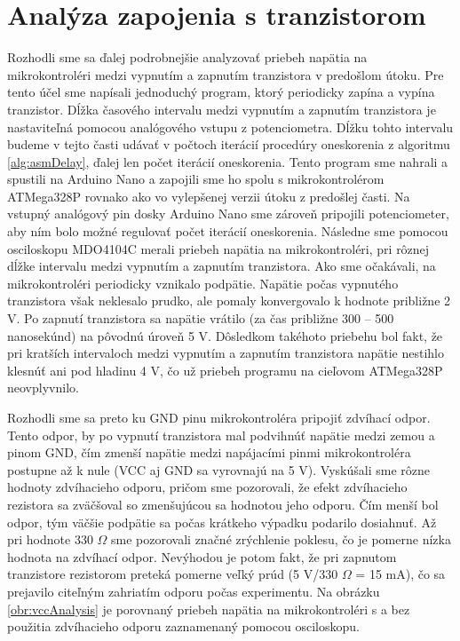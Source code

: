 \section{Analýza zapojenia s tranzistorom}
Rozhodli sme sa ďalej podrobnejšie analyzovať priebeh napätia na mikrokontroléri medzi vypnutím a zapnutím tranzistora v predošlom útoku. Pre tento účel sme napísali jednoduchý program, ktorý periodicky zapína a vypína tranzistor. Dĺžka časového intervalu medzi vypnutím a zapnutím tranzistora je nastaviteľná pomocou analógového vstupu z potenciometra. Dĺžku tohto intervalu budeme v tejto časti udávať v počtoch iterácií procedúry oneskorenia z algoritmu \ref{alg:asmDelay}, ďalej len počet iterácií oneskorenia. Tento program sme nahrali a spustili na Arduino Nano a zapojili sme ho spolu s mikrokontrolérom ATMega328P rovnako ako vo vylepšenej verzii útoku z predošlej časti. Na vstupný analógový pin dosky Arduino Nano sme zároveň pripojili potenciometer, aby ním bolo možné regulovať počet iterácií oneskorenia. Následne sme pomocou osciloskopu MDO4104C merali priebeh napätia na mikrokontroléri, pri rôznej dĺžke intervalu medzi vypnutím a zapnutím tranzistora. Ako sme očakávali, na mikrokontroléri periodicky vznikalo podpätie. Napätie počas vypnutého tranzistora však neklesalo prudko, ale pomaly konvergovalo k hodnote približne 2 V. Po zapnutí tranzistora sa napätie vrátilo (za čas približne 300 -- 500 nanosekúnd) na pôvodnú úroveň 5 V. Dôsledkom takéhoto priebehu bol fakt, že pri kratších intervaloch medzi vypnutím a zapnutím tranzistora napätie nestihlo klesnúť ani pod hladinu 4 V, čo už priebeh programu na cieľovom ATMega328P neovplyvnilo.

Rozhodli sme sa preto ku GND pinu mikrokontroléra pripojiť zdvíhací odpor. Tento odpor, by po vypnutí tranzistora mal podvihnúť napätie medzi zemou a pinom GND, čím zmenší napätie medzi napájacími pinmi mikrokontroléra postupne až k nule (VCC aj GND sa vyrovnajú na 5 V). Vyskúšali sme rôzne hodnoty zdvíhacieho odporu, pričom sme pozorovali, že efekt zdvíhacieho rezistora sa zväčšoval so zmenšujúcou sa hodnotou jeho odporu. Čím menší bol odpor, tým väčšie podpätie sa počas krátkeho výpadku podarilo dosiahnuť. Až pri hodnote 330 $\Omega$ sme pozorovali značné zrýchlenie poklesu, čo je pomerne nízka hodnota na zdvíhací odpor. Nevýhodou je potom fakt, že pri zapnutom tranzistore rezistorom preteká pomerne veľký prúd (5 V/330 $\Omega$ = 15 mA), čo sa prejavilo citeľným zahriatím odporu počas experimentu. Na obrázku \ref{obr:vccAnalysis} je porovnaný priebeh napätia na mikrokontroléri s a bez použitia zdvíhacieho odporu zaznamenaný pomocou osciloskopu.

